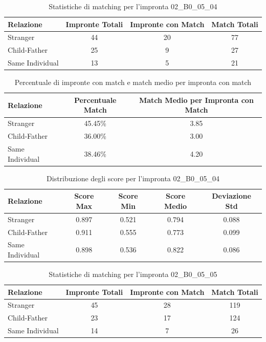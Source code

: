 \begin{table}[htbp]
\centering
\caption{Statistiche di matching per l'impronta 02\_B0\_05\_04}
\label{tab:results_02_B0_05_04}
\begin{tabular}{|l|c|c|c|}
\hline
\textbf{Relazione} & \textbf{Impronte Totali} & \textbf{Impronte con Match} & \textbf{Match Totali} \\
\hline
Stranger & 44 & 20 & 77 \\
\hline
Child-Father & 25 & 9 & 27 \\
\hline
Same Individual & 13 & 5 & 21 \\
\hline
\end{tabular}
\end{table}


\begin{table}[htbp]
\centering
\caption{Percentuale di impronte con match e match medio per impronta con match}
\label{tab:match_percentage_02_B0_05_04}
\begin{tabular}{|l|c|c|}
\hline
\textbf{Relazione} & \textbf{Percentuale Match} & \textbf{Match Medio per Impronta con Match} \\
\hline
Stranger & 45.45\% & 3.85 \\
\hline
Child-Father & 36.00\% & 3.00 \\
\hline
Same Individual & 38.46\% & 4.20 \\
\hline
\end{tabular}
\end{table}


\begin{table}[htbp]
\centering
\caption{Distribuzione degli score per l'impronta 02\_B0\_05\_04}
\label{tab:scores_02_B0_05_04}
\begin{tabular}{|l|c|c|c|c|}
\hline
\textbf{Relazione} & \textbf{Score Max} & \textbf{Score Min} & \textbf{Score Medio} & \textbf{Deviazione Std} \\
\hline
Stranger & 0.897 & 0.521 & 0.794 & 0.088 \\
\hline
Child-Father & 0.911 & 0.555 & 0.773 & 0.099 \\
\hline
Same Individual & 0.898 & 0.536 & 0.822 & 0.086 \\
\hline
\end{tabular}
\end{table}


\begin{table}[htbp]
\centering
\caption{Statistiche di matching per l'impronta 02\_B0\_05\_05}
\label{tab:results_02_B0_05_05}
\begin{tabular}{|l|c|c|c|}
\hline
\textbf{Relazione} & \textbf{Impronte Totali} & \textbf{Impronte con Match} & \textbf{Match Totali} \\
\hline
Stranger & 45 & 28 & 119 \\
\hline
Child-Father & 23 & 17 & 124 \\
\hline
Same Individual & 14 & 7 & 26 \\
\hline
\end{tabular}
\end{table}



